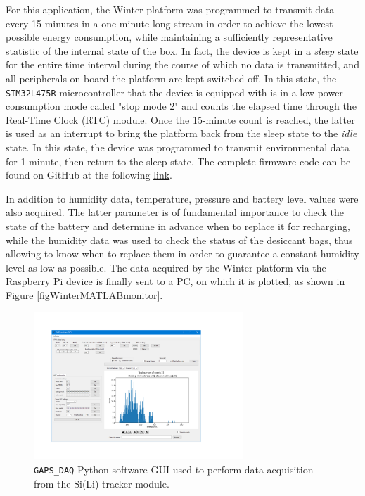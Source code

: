 \par
For this application, the Winter platform was programmed to transmit data every 15 minutes in a one minute-long stream in order to achieve the lowest possible energy consumption, while maintaining a sufficiently representative statistic of the internal state of the box. In fact, the device is kept in a \textit{sleep} state for the entire time interval during the course of which no data is transmitted, and all peripherals on board the platform are kept switched off. In this state, the \texttt{STM32L475R} microcontroller that the device is equipped with is in a low power consumption mode called "stop mode 2" and counts the elapsed time through the Real-Time Clock (RTC) module. Once the 15-minute count is reached, the latter is used as an interrupt to bring the platform back from the sleep state to the \textit{idle} state. In this state, the device was programmed to transmit environmental data for 1 minute, then return to the sleep state. The complete firmware code can be found on GitHub at the following \href{https://github.com/lucaghislo/winterGAPS/tree/main}{\underline{link}}.

\par
In addition to humidity data, temperature, pressure and battery level values were also acquired. The latter parameter is of fundamental importance to check the state of the battery and determine in advance when to replace it for recharging, while the humidity data was used to check the status of the desiccant bags, thus allowing to know when to replace them in order to guarantee a constant humidity level as low as possible. The data acquired by the Winter platform via the Raspberry Pi device is finally sent to a PC, on which it is plotted, as shown in \hyperref[figWinterMATLABmonitor]{Figure \ref{figWinterMATLABmonitor}}.

\begin{figure}[h!]
    \centering
    \includegraphics[width=0.7\textwidth]{Images/chap3/GAPS_DAQ.pdf}
    \caption{\texttt{GAPS\_DAQ} Python software GUI used to perform data acquisition from the Si(Li) tracker module.}
    \label{figGapsDAQpy}
\end{figure}

